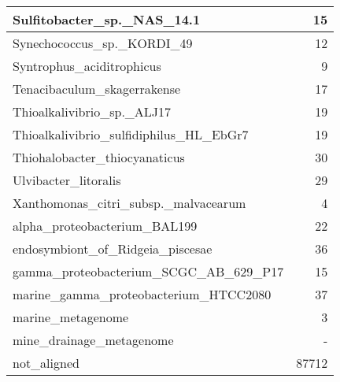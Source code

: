 \documentclass[12pt,a4paper]{article}
\begin{document}
\begin{table}[ht]
\begin{center}
\begin{tabular}{|l*{1}{|r}|}
Sulfitobacter\_sp.\_NAS\_14.1 & 15 \\ \hline
Synechococcus\_sp.\_KORDI\_49 & 12 \\ \hline
Syntrophus\_aciditrophicus & 9 \\ \hline
Tenacibaculum\_skagerrakense & 17 \\ \hline
Thioalkalivibrio\_sp.\_ALJ17 & 19 \\ \hline
Thioalkalivibrio\_sulfidiphilus\_HL\_EbGr7 & 19 \\ \hline
Thiohalobacter\_thiocyanaticus & 30 \\ \hline
Ulvibacter\_litoralis & 29 \\ \hline
Xanthomonas\_citri\_subsp.\_malvacearum & 4 \\ \hline
alpha\_proteobacterium\_BAL199 & 22 \\ \hline
endosymbiont\_of\_Ridgeia\_piscesae & 36 \\ \hline
gamma\_proteobacterium\_SCGC\_AB\_629\_P17 & 15 \\ \hline
marine\_gamma\_proteobacterium\_HTCC2080 & 37 \\ \hline
marine\_metagenome & 3 \\ \hline
mine\_drainage\_metagenome & - \\ \hline
not\_aligned & 87712 \\ \hline
\end{tabular}
\end{center}
\end{table}
\end{document}
